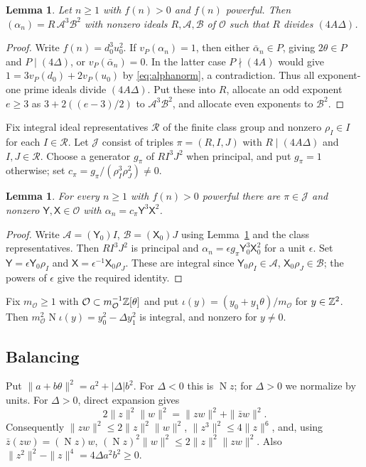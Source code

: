 \documentclass[11pt,reqno]{amsart}
\newtheorem{lemma}[theorem]{Lemma}
\theoremstyle{definition}
\theoremstyle{remark}
\numberwithin{equation}{section}
\newcommand{\OO}{\mathcal O}
\newcommand{\Nm}{\operatorname{N}}
\begin{document}
\begin{lemma}\label{lem:ideal}
Let $n\ge1$ with $f(n)>0$ and $f(n)$ powerful. Then
$(\alpha_n)=R\,\mathcal A^3\mathcal B^2$ with nonzero ideals
$R,\mathcal A,\mathcal B$ of $\OO$ such that $R$ divides $(4A\Delta)$.
\end{lemma}
\begin{proof}
Write $f(n)=d_0^3u_0^2$. If $v_P(\alpha_n)=1$, then either
$\bar\alpha_n\in P$, giving $2\theta\in P$ and $P\mid(4\Delta)$, or
$v_P(\bar\alpha_n)=0$. In the latter case $P\nmid(4A)$ would give
$1=3v_P(d_0)+2v_P(u_0)$ by \eqref{eq:alphanorm}, a contradiction.
Thus all exponent-one prime ideals divide $(4A\Delta)$. Put these into
$R$, allocate an odd exponent $e\ge3$ as $3+2((e-3)/2)$ to
$\mathcal A^3\mathcal B^2$, and allocate even exponents to $\mathcal B^2$.
\end{proof}

Fix integral ideal representatives $\mathcal R$ of the finite class
group and nonzero $\rho_I\in I$ for each $I\in\mathcal R$.
Let $\mathcal J$ consist of triples $\pi=(R,I,J)$ with
$R\mid(4A\Delta)$ and $I,J\in\mathcal R$. Choose a generator
$g_\pi$ of $RI^3J^2$ when principal, and put $g_\pi=1$ otherwise;
set $c_\pi=g_\pi/(\rho_I^3\rho_J^2)\ne0$.

\begin{lemma}\label{lem:unbalanced}
For every $n\ge1$ with $f(n)>0$ powerful there are $\pi\in\mathcal J$ and
nonzero $\mathsf Y,\mathsf X\in\OO$ with $\alpha_n=c_\pi \mathsf Y^3\mathsf X^2$.
\end{lemma}
\begin{proof}
Write $\mathcal A=(\mathsf Y_0)I$, $\mathcal B=(\mathsf X_0)J$ using
Lemma~\ref{lem:ideal} and the class representatives. Then $RI^3J^2$ is
principal and $\alpha_n=\epsilon g_\pi\mathsf Y_0^3\mathsf X_0^2$ for a
unit $\epsilon$. Set $\mathsf Y=\epsilon\mathsf Y_0\rho_I$ and
$\mathsf X=\epsilon^{-1}\mathsf X_0\rho_J$. These are integral since
$\mathsf Y_0\rho_I\in\mathcal A$, $\mathsf X_0\rho_J\in\mathcal B$;
the powers of $\epsilon$ give the required identity.
\end{proof}

Fix $m_{\OO}\ge1$ with $\OO\subset m_{\OO}^{-1}\Z[\theta]$ and put
$\iota(y)=(y_0+y_1\theta)/m_{\OO}$ for $y\in\mathbb Z^2$.
Then $m_{\OO}^2\Nm\iota(y)=y_0^2-\Delta y_1^2$ is integral,
and nonzero for $y\ne0$.

\subsection{Balancing}
Put $\|a+b\theta\|^2=a^2+|\Delta|b^2$. For $\Delta<0$ this is
$\Nm z$; for $\Delta>0$ we normalize by units. For $\Delta>0$, direct expansion gives
\begin{equation}\label{eq:parallelogram}
 2\|z\|^2\|w\|^2=\|zw\|^2+\|\bar zw\|^2 .
\end{equation}
Consequently $\|zw\|^2\le2\|z\|^2\|w\|^2$,
$\|z^3\|^2\le4\|z\|^6$, and, using $\bar z(zw)=(\Nm z)w$,
$(\Nm z)^2\|w\|^2\le2\|z\|^2\|zw\|^2$.
Also $\|z^2\|^2-\|z\|^4=4\Delta a^2b^2\ge0$.
\end{document}
